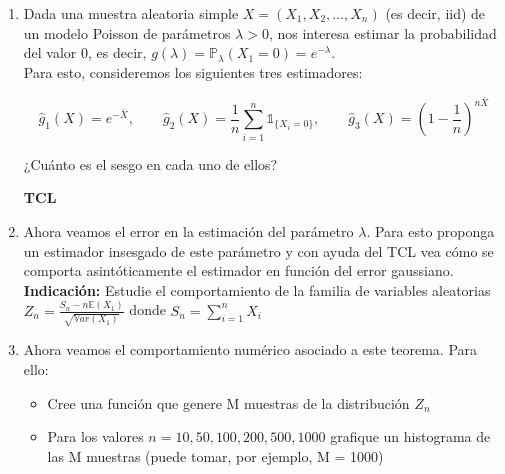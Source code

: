 \documentclass[letterpaper,11pt]{article}
\theoremstyle{plain}
\theoremstyle{definition}
\newcommand{\proba}{\mathbb{P}}
\newcommand{\ds}{\displaystyle}
\newcommand{\E}{\mathbb{E}}
\newcommand{\Var}{\mathbb{V}ar}
\newcommand{\1}{\mathbbm{1}}
\begin{document}
\begin{enumerate}[label=\textbf{P{\arabic*}}]

\item Dada una muestra aleatoria simple $X = (X_1, X_2,  \ldots, X_n)$ (es decir, iid) de un modelo Poisson de parámetros $\lambda >0$, nos interesa estimar la probabilidad del valor $0$, es decir, $g(\lambda) = \proba _\lambda (X_1 = 0)  =e^{-\lambda}$.\\

Para esto, consideremos los siguientes tres estimadores:

$$\hat{g}_1 (X) = e^{-\bar{X}}, \qquad \hat{g}_2 (X) = \frac{1}{n}\sum_{i=1}^{n}\mathds{1}_{\lbrace X_i =0\rbrace}, \qquad \hat{g}_3 (X) = \left(1- \frac{1}{n} \right)^{n\bar{X}}$$

¿Cuánto es el sesgo en cada uno de ellos?

\textbf{TCL}

\item Ahora veamos el error en la estimación del parámetro $\lambda$. Para esto proponga un estimador insesgado de este parámetro y con ayuda del TCL vea cómo se comporta asintóticamente el estimador en función del error gaussiano. \textbf{Indicación:} Estudie el comportamiento de la familia de variables aleatorias $\ds Z_n = \frac{S_n - n\E(X_1)}{\sqrt{\Var(X_1)}}$ donde $\ds S_n = \sum_{i=1}^n X_i$

\item Ahora veamos el comportamiento numérico asociado a este teorema. Para ello:

\begin{itemize}
    
    \item Cree una función que genere M muestras de la distribución $Z_n$
    
    \item Para los valores $n = 10, 50, 100, 200, 500, 1000$ grafique un histograma de las M muestras (puede tomar, por ejemplo, M = 1000)
    
    
    
\end{itemize}

\end{enumerate}
\end{document}
